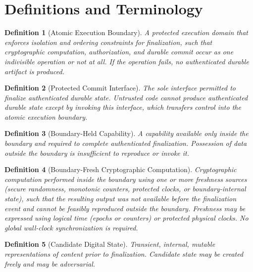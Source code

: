 \documentclass[11pt,letterpaper]{article}
\theoremstyle{occplain}
\newtheorem{definition}{Definition}[section]
\theoremstyle{occremark}
\begin{document}
\section{Definitions and Terminology}
\label{sec:definitions}

\begin{definition}[Atomic Execution Boundary]
\label{def:aeb}
A protected execution domain that enforces isolation and ordering constraints for finalization, such that cryptographic computation, authorization, and durable commit occur as one indivisible operation or not at all. If the operation fails, no authenticated durable artifact is produced.
\end{definition}

\begin{definition}[Protected Commit Interface]
\label{def:pci}
The sole interface permitted to finalize authenticated durable state. Untrusted code cannot produce authenticated durable state except by invoking this interface, which transfers control into the atomic execution boundary.
\end{definition}

\begin{definition}[Boundary-Held Capability]
\label{def:bhc}
A capability available only inside the boundary and required to complete authenticated finalization. Possession of data outside the boundary is insufficient to reproduce or invoke it.
\end{definition}

\begin{definition}[Boundary-Fresh Cryptographic Computation]
\label{def:bfcc}
Cryptographic computation performed inside the boundary using one or more freshness sources (secure randomness, monotonic counters, protected clocks, or boundary-internal state), such that the resulting output was not available before the finalization event and cannot be feasibly reproduced outside the boundary. Freshness may be expressed using logical time (epochs or counters) or protected physical clocks. No global wall-clock synchronization is required.
\end{definition}

\begin{definition}[Candidate Digital State]
\label{def:cds}
Transient, internal, mutable representations of content prior to finalization. Candidate state may be created freely and may be adversarial.
\end{definition}
\end{document}
